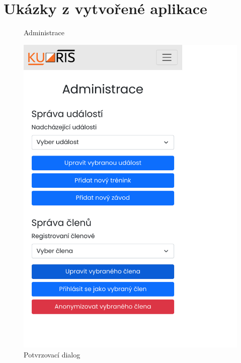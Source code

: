 \chapter{Ukázky z vytvořené aplikace}\label{appendix}

\begin{figure}[h]
    \centering
    \begin{minipage}[b]{0.48\linewidth}
        \caption{Administrace}
        \includegraphics[width=0.99\linewidth, trim={0 2pt 0 0}, cfbox=kuorisgray 0.5pt 0pt]{images/appendix-admin.pdf}
    \end{minipage}
    \hfill
    \begin{minipage}[b]{0.48\linewidth}
        \caption{Potvrzovací dialog}

\end{minipage}
\end{figure}
